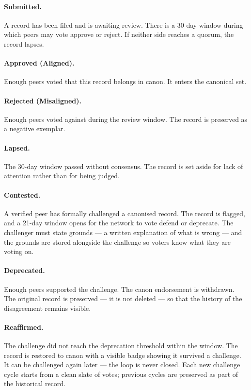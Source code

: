 \documentclass[11pt,a4paper]{article}
\begin{document}
\paragraph{Submitted.} A record has been filed and is awaiting
review. There is a 30-day window during which peers may vote
approve or reject. If neither side reaches a quorum, the record
lapses.

\paragraph{Approved (Aligned).} Enough peers voted that this
record belongs in canon. It enters the canonical set.

\paragraph{Rejected (Misaligned).} Enough peers voted against
during the review window. The record is preserved as a negative
exemplar.

\paragraph{Lapsed.} The 30-day window passed without consensus.
The record is set aside for lack of attention rather than for
being judged.

\paragraph{Contested.} A verified peer has formally challenged a
canonised record. The record is flagged, and a 21-day window
opens for the network to vote defend or deprecate. The
challenger must state grounds --- a written explanation of what
is wrong --- and the grounds are stored alongside the challenge
so voters know what they are voting on.

\paragraph{Deprecated.} Enough peers supported the challenge.
The canon endorsement is withdrawn. The original record is
preserved --- it is not deleted --- so that the history of the
disagreement remains visible.

\paragraph{Reaffirmed.} The challenge did not reach the
deprecation threshold within the window. The record is restored
to canon with a visible badge showing it survived a challenge.
It can be challenged again later --- the loop is never closed.
Each new challenge cycle starts from a clean slate of votes;
previous cycles are preserved as part of the historical record.
\end{document}
